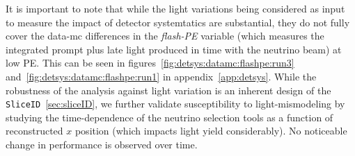 \par It is important to note that while the light variations being considered as input to measure the impact of detector systemtatics are substantial, they do not fully cover the data-mc differences in the \textit{flash-PE} variable (which measures the integrated prompt plus late light produced in time with the neutrino beam) at low PE. This can be seen in figures~\ref{fig:detsys:datamc:flashpe:run3} and~\ref{fig:detsys:datamc:flashpe:run1} in appendix~\ref{app:detsys}. While the robustness of the analysis against light variation is an inherent design of the \texttt{SliceID}~\ref{sec:sliceID}, we further validate susceptibility to light-mismodeling by studying the time-dependence of the neutrino selection tools as a function of reconstructed $x$ position (which impacts light yield considerably). No noticeable change in performance is observed over time.

